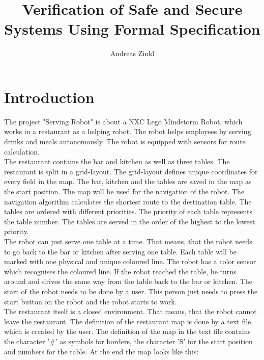 \documentclass[11pt,a4paper]{article}
\title{Verification of Safe and Secure Systems Using Formal Specification}
\author{Andreas Zinkl}
\renewcommand{\headrulewidth}{1pt}
\begin{document}


\newpage
\fancyhf{} \renewcommand{\headrulewidth}{1pt}
\fancyhead[RO]{\thepage}
\tableofcontents
\newpage



\newpage
{}

\section{Introduction}
The project "Serving Robot" is about a NXC Lego Mindstorm Robot, which works in a restaurant as a helping robot. The robot helps employees by serving drinks and meals autonomously. The robot is equipped with sensors for route calculation.\\

The restaurant contains the bar and kitchen as well as three tables. The restaurant is split in a grid-layout. The grid-layout defines unique coordinates for every field in the map. The bar, kitchen and the tables are saved in the map as the start position. The map will be used for the navigation of the robot. The navigation algorithm calculates the shortest route to the destination table. The tables are ordered with different priorities. The priority of each table represents the table number. The tables are served in the order of the highest to the lowest priority.\\

The robot can just serve one table at a time. That means, that the robot needs to go back to the bar or kitchen after serving one table. Each table will be marked with one physical and unique coloured line. The robot has a color sensor which recognises the coloured line. If the robot reached the table, he turns around and drives the same way from the table back to the bar or kitchen. The start of the robot needs to be done by a user. This person just needs to press the start button on the robot and the robot starts to work.\\

The restaurant itself is a closed environment. That means, that the robot cannot leave the restaurant. The definition of the restaurant map is done by a text file, which is created by the user. The definition of the map in the text file contains the character '$\#$' as symbols for borders, the character 'S' for the start position and numbers for the table. At the end the map looks like this:
\end{document}
